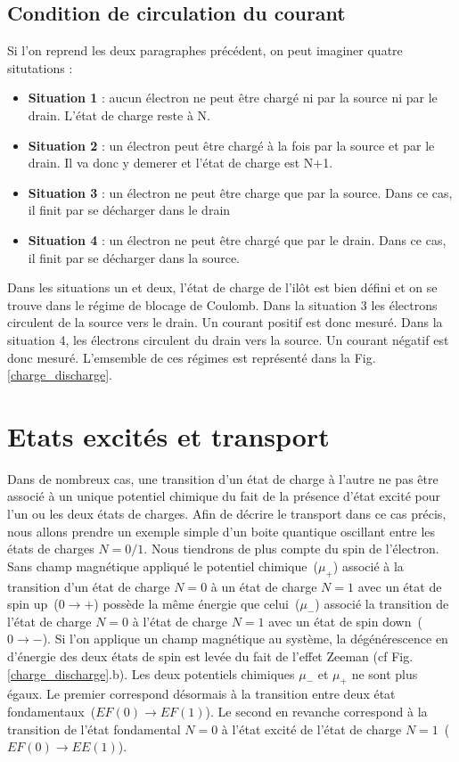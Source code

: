 \subsection{Condition de circulation du courant}

Si l'on reprend les deux paragraphes précédent, on peut imaginer quatre situtations :
\begin{itemize}
\item \textbf{Situation 1} : aucun électron ne peut \^etre chargé ni par la source ni par le drain. L'état de charge reste à N.
\item \textbf{Situation 2} : un électron peut \^etre chargé à la fois par la source et par le drain. Il va donc y demerer et l'état de charge est N+1.
\item \textbf{Situation 3} : un électron ne peut \^etre charge que par la source. Dans ce cas, il finit par se décharger dans le drain
\item \textbf{Situation 4} : un électron ne peut \^etre chargé que par le drain. Dans ce cas, il finit par se décharger dans la source. \newline
\end{itemize}

Dans les situations un et deux, l'état de charge de l'il\^ot est bien défini et on se trouve dans le régime de blocage de Coulomb. Dans la situation 3 les électrons circulent de la source vers le drain. Un courant positif est donc mesuré. Dans la situation 4, les électrons circulent du drain vers la source. Un courant négatif est donc mesuré. L'emsemble de ces régimes est représenté dans la Fig. \ref{charge_discharge}.

\section{Etats excités et transport}

Dans de nombreux cas, une transition d'un état de charge à l'autre ne pas être associé à un unique potentiel chimique du fait de la présence d'état excité pour l'un ou les deux états de charges. Afin de décrire le transport dans ce cas précis, nous allons prendre un exemple simple d'un boite quantique oscillant entre les états de charges $N=0/1$. Nous tiendrons de plus compte du spin de l'électron. Sans champ magnétique appliqué le potentiel chimique~($\mu_{+}$) associé à la transition d'un état de charge $N=0$ à un état de charge $N=1$ avec un état de spin up~($0\rightarrow +$) possède la m\^eme énergie que celui~($\mu_{-}$) associé la transition de l'état de charge $N=0$ à l'état de charge $N=1$ avec un état de spin down~($0\rightarrow -$).
Si l'on applique un champ magnétique au système, la dégénérescence en d'énergie des deux états de spin est levée du fait de l'effet Zeeman (cf Fig. \ref{charge_discharge}.b). Les deux potentiels chimiques $\mu_{-}$ et $\mu_{+}$ ne sont plus égaux. Le premier correspond désormais à la transition entre deux état fondamentaux~($EF(0)\rightarrow EF(1)$). Le second en revanche correspond à la transition de l'état fondamental $N=0$ à l'état excité de l'état de charge $N=1$~($EF(0)\rightarrow EE(1)$).

